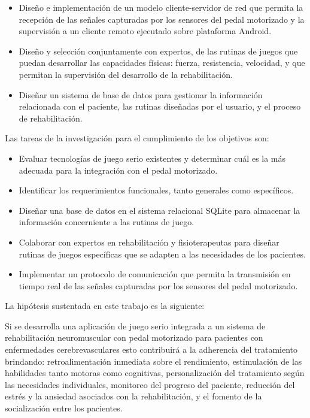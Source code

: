 \begin{introduction}
    \begin{itemize}
        \item Diseño e implementación de un modelo cliente-servidor de red que permita la recepción de las señales capturadas por los sensores del pedal motorizado y la supervisión a un cliente remoto ejecutado sobre plataforma Android.
        \item  Diseño y selección conjuntamente con expertos, de las rutinas de juegos que puedan desarrollar las capacidades físicas: fuerza, resistencia, velocidad, y que permitan la supervisión del desarrollo de la rehabilitación.
        \item Diseñar un sistema de base de datos para gestionar la información relacionada con el paciente, las rutinas diseñadas por el usuario, y el proceso de rehabilitación.
    \end{itemize}

    Las tareas de la investigación para el cumplimiento de los objetivos son:
    \begin{itemize}
        \item Evaluar tecnologías de juego serio existentes y determinar cuál es la más adecuada para la integración con el pedal motorizado.
        \item Identificar los requerimientos funcionales, tanto generales como específicos.
        \item Diseñar una base de datos en el sistema relacional SQLite para almacenar la información concerniente a las rutinas de juego. 
        \item Colaborar con expertos en rehabilitación y fisioterapeutas para diseñar rutinas de juegos específicas que se adapten a las necesidades de los pacientes.
        \item Implementar un protocolo de comunicación que permita la transmisión en tiempo real de las señales capturadas por los sensores del pedal motorizado. 
    \end{itemize}

    La hipótesis sustentada en este trabajo es la siguiente:
    
    Si se desarrolla una aplicación de juego serio integrada a un sistema de rehabilitación neuromuscular con pedal motorizado para pacientes con
    enfermedades cerebrevasculares esto contribuirá a la adherencia del tratamiento brindando: retroalimentación inmediata sobre el rendimiento, estimulación de las habilidades tanto motoras como cognitivas, personalización del tratamiento según las necesidades individuales, monitoreo del progreso del paciente, reducción del estrés y la ansiedad asociados con la rehabilitación, y el fomento de la socialización entre los pacientes.


\end{introduction}
